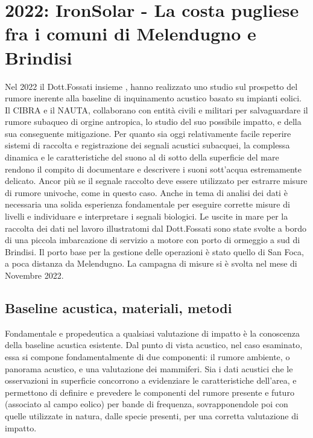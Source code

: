 \section{2022: IronSolar - La costa pugliese fra i comuni di Melendugno e Brindisi} 
Nel 2022 il Dott.Fossati insieme , hanno realizzato uno studio sul prospetto del rumore inerente alla baseline di inquinamento acustico basato su impianti eolici. 
Il CIBRA e il NAUTA, collaborano con entità civili e militari per salvaguardare il rumore subaqueo di orgine antropica, lo studio del suo possibile impatto, e della sua conseguente mitigazione. 
Per quanto sia oggi relativamente facile reperire sistemi di raccolta e registrazione dei segnali acustici subacquei, la complessa dinamica e le caratteristiche del suono al di sotto della superficie del mare rendono il compito di documentare e descrivere i suoni sott’acqua estremamente delicato. 
Ancor più se il segnale raccolto deve essere utilizzato per estrarre misure di rumore univoche, come in questo caso. 
Anche in tema di analisi dei dati è necessaria una solida esperienza fondamentale per eseguire corrette misure di livelli e individuare e interpretare i segnali biologici.
Le uscite in mare per la raccolta dei dati nel lavoro illustratomi dal Dott.Fossati sono state svolte a bordo di una piccola imbarcazione di servizio a motore con porto di ormeggio a sud di Brindisi. 
Il porto base per la gestione delle operazioni è stato quello di San Foca, a poca distanza da Melendugno. 
La campagna di misure si è svolta nel mese di Novembre 2022. 

\subsection{Baseline acustica, materiali, metodi} 
Fondamentale e propedeutica a qualsiasi valutazione di impatto è la conoscenza della baseline acustica esistente. 
Dal punto di vista acustico, nel caso esaminato, essa si compone fondamentalmente di due componenti: il rumore ambiente, o panorama acustico, e una valutazione dei mammiferi. 
Sia i dati acustici che le osservazioni in superficie concorrono a evidenziare le caratteristiche dell’area, e permettono di definire e prevedere le componenti del rumore presente e futuro (associato al campo eolico) per bande di frequenza, 
sovrapponendole poi con quelle utilizzate in natura, dalle specie presenti, per una corretta valutazione di impatto. 

